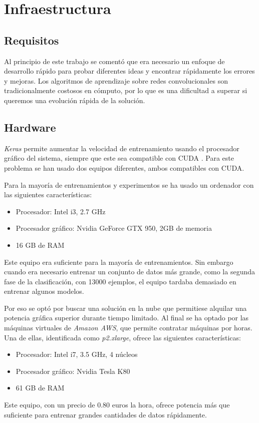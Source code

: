 
\chapter{Infraestructura} 
\label{ap:hardware}

\section{Requisitos}

Al principio de este trabajo se comentó que era necesario un enfoque de
desarrollo rápido para probar diferentes ideas y encontrar rápidamente los
errores y mejoras. Los algoritmos de aprendizaje sobre redes convolucionales
son tradicionalmente costosos en cómputo, por lo que es una dificultad a
superar si queremos una evolución rápida de la solución.

\section{Hardware}

\textit{Keras} permite aumentar la velocidad de entrenamiento usando el
procesador gráfico del sistema, siempre que este sea compatible con CUDA \parencite{cuda}.
Para este problema se han usado dos equipos diferentes, ambos compatibles con
CUDA.

Para la mayoría de entrenamientos y experimentos se ha usado un ordenador con las siguientes características:

\begin{itemize}
    \item{Procesador: Intel i3, 2.7 GHz}
    \item{Procesador gráfico: Nvidia GeForce GTX 950, 2GB de memoria}
    \item{16 GB de RAM}
\end{itemize}

Este equipo era suficiente para la mayoría de entrenamientos. Sin embargo cuando era necesario entrenar un conjunto de datos más grande, como la segunda fase de la clasificación, con 13000 ejemplos, el equipo tardaba demasiado en entrenar algunos modelos.

Por eso se optó por buscar una solución en la nube que permitiese alquilar una
potencia gráfica superior durante tiempo limitado. Al final se ha optado por
las máquinas virtuales de \textit{Amazon AWS}, que permite contratar máquinas
por horas. Una de ellas, identificada como \textit{p2.xlarge}, ofrece las
siguientes características:

\begin{itemize}
    \item{Procesador: Intel i7, 3.5 GHz, 4 núcleos}
    \item{Procesador gráfico: Nvidia Tesla K80}
    \item{61 GB de RAM}
\end{itemize}

Este equipo, con un precio de 0.80 euros la hora, ofrece potencia más que suficiente para entrenar grandes cantidades de datos rápidamente.

